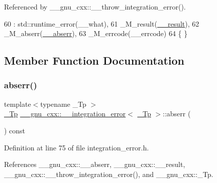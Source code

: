 Referenced by \+\_\+\+\_\+gnu\+\_\+cxx\+::\+\_\+\+\_\+throw\+\_\+integration\+\_\+error().


\begin{DoxyCode}
60       : std::runtime\_error(\_\_what),
61         \_M\_result(\hyperlink{namespace____gnu__cxx_a500ea9f53aeaecd8c2ae657503450578}{\_\_result}),
62         \_M\_abserr(\hyperlink{namespace____gnu__cxx_a72f736cff127f1574e91a301de9e074b}{\_\_abserr}),
63         \_M\_errcode(\_\_errcode)
64       \{ \}
\end{DoxyCode}


\subsection{Member Function Documentation}
\mbox{\label{class____gnu__cxx_1_1____integration__error_a0194cc847bfbe439a8a1b41cda1d8572}} 
\subsubsection{\texorpdfstring{abserr()}{abserr()}}
{\footnotesize\ttfamily template$<$typename \+\_\+\+Tp $>$ \\
\hyperlink{namespace____gnu__cxx_a3b19a9c800ca194374ef9172290f7d79}{\+\_\+\+Tp} \hyperlink{class____gnu__cxx_1_1____integration__error}{\+\_\+\+\_\+gnu\+\_\+cxx\+::\+\_\+\+\_\+integration\+\_\+error}$<$ \hyperlink{namespace____gnu__cxx_a3b19a9c800ca194374ef9172290f7d79}{\+\_\+\+Tp} $>$\+::abserr (\begin{DoxyParamCaption}{ }\end{DoxyParamCaption}) const\hspace{0.3cm}{\ttfamily [inline]}}



Definition at line 75 of file integration\+\_\+error.\+h.



References \+\_\+\+\_\+gnu\+\_\+cxx\+::\+\_\+\+\_\+abserr, \+\_\+\+\_\+gnu\+\_\+cxx\+::\+\_\+\+\_\+result, \+\_\+\+\_\+gnu\+\_\+cxx\+::\+\_\+\+\_\+throw\+\_\+integration\+\_\+error(), and \+\_\+\+\_\+gnu\+\_\+cxx\+::\+\_\+\+Tp.



